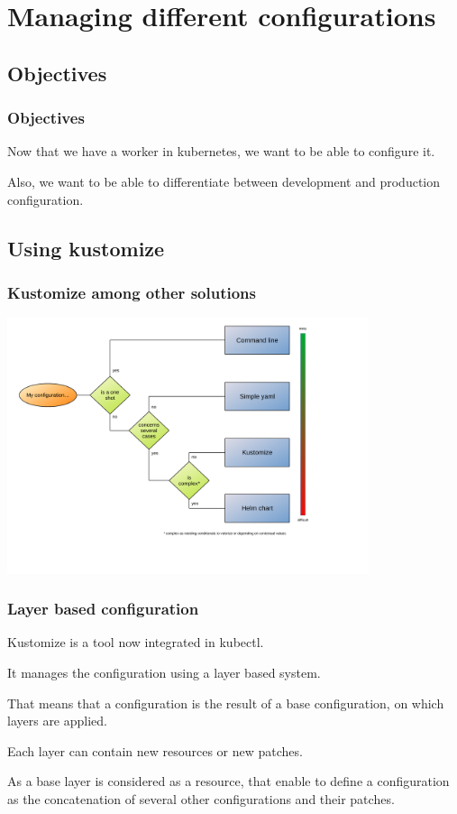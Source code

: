 \section{Managing different configurations}

\subsection{Objectives}

	\begin{frame}
		\frametitle{Objectives}
		
		Now that we have a worker in kubernetes, we want to be able to configure it.
		
		Also, we want to be able to differentiate between development and production configuration.
		
	\end{frame}
	
\subsection{Using kustomize}	
	
	\begin{frame}
		\frametitle{Kustomize among other solutions}
		
		\begin{center}
		\includegraphics[height=7.5cm]{../../../resources/color/choiceConfigKind.pdf}
		\end{center}
	\end{frame}
	
	\begin{frame}
		\frametitle{Layer based configuration}
		
		Kustomize is a tool now integrated in kubectl.
		
		\bigskip
		It manages the configuration using a layer based system.
		
		That means that a configuration is the result of a base configuration, on which layers are applied.
		
		Each layer can contain new resources or new patches.
		
		\bigskip
		As a base layer is considered as a resource, that enable to define a configuration as the concatenation of several other configurations and their patches.
	\end{frame}
	
